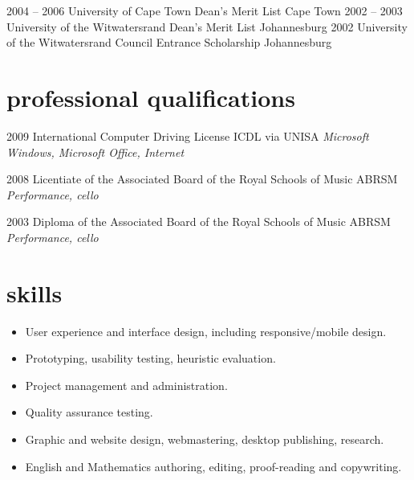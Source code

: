 \documentclass[]{friggeri-cv} %
\begin{document}
\begin{entrylist}
\entry
{2004 -- 2006}
{University of Cape Town Dean's Merit List}
{Cape Town}
{}
\entry
{2002 -- 2003}
{University of the Witwatersrand Dean's Merit List}
{Johannesburg}
{}
\entry
{2002}
{University of the Witwatersrand Council Entrance Scholarship}
{Johannesburg}
{}
\end{entrylist}

\section{professional qualifications}

\begin{entrylist}
\entry
{2009}
{International Computer Driving License}
{ICDL via UNISA}
{\emph{Microsoft Windows, Microsoft Office, Internet}}

\entry
{2008}
{Licentiate of the Associated Board of the Royal Schools of Music}
{ABRSM}
{\emph{Performance, cello}}

\entry
{2003}
{Diploma of the Associated Board of the Royal Schools of Music}
{ABRSM}
{\emph{Performance, cello}}

\end{entrylist}


\section{skills}

\begin{itemize}
\item User experience and interface design, including responsive/mobile design.
\item Prototyping, usability testing, heuristic evaluation.
\item Project management and administration.
\item Quality assurance testing.
\item Graphic and website design, webmastering, desktop publishing, research.
\item English and Mathematics authoring, editing, proof-reading and copywriting.

\end{itemize}
\end{document}
